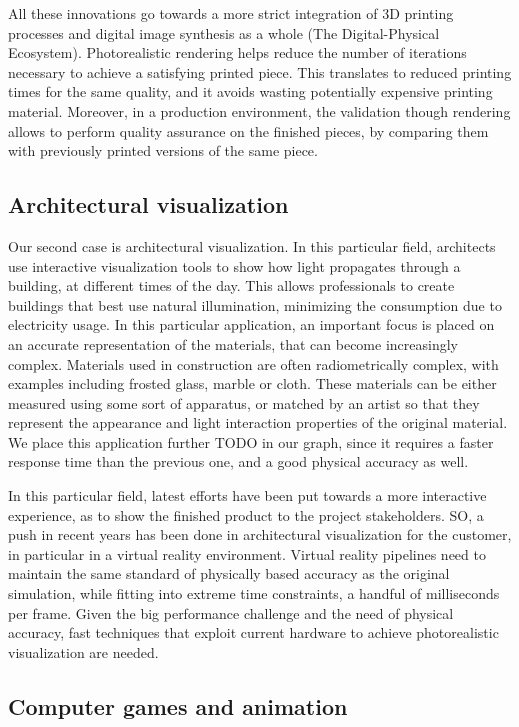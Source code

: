 All these innovations go towards a more strict integration of 3D printing processes and digital image synthesis as a whole (The Digital-Physical Ecosystem). Photorealistic rendering helps reduce the number of iterations necessary to achieve a satisfying printed piece. This translates to reduced printing times for the same quality, and it avoids wasting potentially expensive printing material. Moreover, in a production environment, the validation though rendering allows to perform quality assurance on the finished pieces, by comparing them with previously printed versions of the same piece.

\subsection{Architectural visualization}

Our second case is architectural visualization. In this particular field, architects use interactive visualization tools to show how light propagates through a building, at different times of the day. This allows professionals to create buildings that best use natural illumination, minimizing the consumption due to electricity usage. In this particular application, an important focus is placed on an accurate representation of the materials, that can become increasingly complex. Materials used in construction are often radiometrically complex, with examples including frosted glass, marble or cloth. These materials can be either measured using some sort of apparatus, or matched by an artist so that they represent the appearance and light interaction properties of the original material. We place this application further TODO in our graph, since it requires a faster response time than the previous one, and a good physical accuracy as well. 

In this particular field, latest efforts have been put towards a more interactive experience, as to show the finished product to the project stakeholders. SO, a push in recent years has been done in architectural visualization for the customer, in particular in a virtual reality environment. Virtual reality pipelines need to maintain the same standard of physically based accuracy as the original simulation, while fitting into extreme time constraints, a handful of milliseconds per frame. Given the big performance challenge and the need of physical accuracy, fast techniques that exploit current hardware to achieve photorealistic visualization are needed.

\subsection{Computer games and animation}

